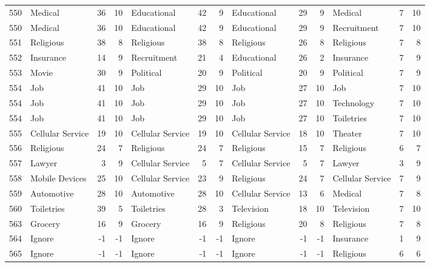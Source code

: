 \begin{figure}[htbp]
\begin{tabular}{rlrrlrrlrrlrr}
    550   & Medical & 36    & 10    & Educational & 42    & 9     & Educational & 29    & 9     & Medical & 7     & 10 \\
    550   & Medical & 36    & 10    & Educational & 42    & 9     & Educational & 29    & 9     & Recruitment & 7     & 10 \\
    551   & Religious & 38    & 8     & Religious & 38    & 8     & Religious & 26    & 8     & Religious & 7     & 8 \\
    552   & Insurance & 14    & 9     & Recruitment & 21    & 4     & Educational & 26    & 2     & Insurance & 7     & 9 \\
    553   & Movie & 30    & 9     & Political & 20    & 9     & Political & 20    & 9     & Political & 7     & 9 \\
    554   & Job   & 41    & 10    & Job   & 29    & 10    & Job   & 27    & 10    & Job   & 7     & 10 \\
    554   & Job   & 41    & 10    & Job   & 29    & 10    & Job   & 27    & 10    & Technology & 7     & 10 \\
    554   & Job   & 41    & 10    & Job   & 29    & 10    & Job   & 27    & 10    & Toiletries & 7     & 10 \\
    555   & Cellular Service & 19    & 10    & Cellular Service & 19    & 10    & Cellular Service & 18    & 10    & Theater & 7     & 10 \\
    556   & Religious & 24    & 7     & Religious & 24    & 7     & Religious & 15    & 7     & Religious & 6     & 7 \\
    557   & Lawyer & 3     & 9     & Cellular Service & 5     & 7     & Cellular Service & 5     & 7     & Lawyer & 3     & 9 \\
    558   & Mobile Devices & 25    & 10    & Cellular Service & 23    & 9     & Religious & 24    & 7     & Cellular Service & 7     & 9 \\
    559   & Automotive & 28    & 10    & Automotive & 28    & 10    & Cellular Service & 13    & 6     & Medical & 7     & 8 \\
    560   & Toiletries & 39    & 5     & Toiletries & 28    & 3     & Television & 18    & 10    & Television & 7     & 10 \\
    563   & Grocery & 16    & 9     & Grocery & 16    & 9     & Religious & 20    & 8     & Religious & 7     & 8 \\
    564   & Ignore & -1    & -1    & Ignore & -1    & -1    & Ignore & -1    & -1    & Insurance & 1     & 9 \\
    565   & Ignore & -1    & -1    & Ignore & -1    & -1    & Ignore & -1    & -1    & Religious & 6     & 6 \\

\end{tabular}
\end{figure}
